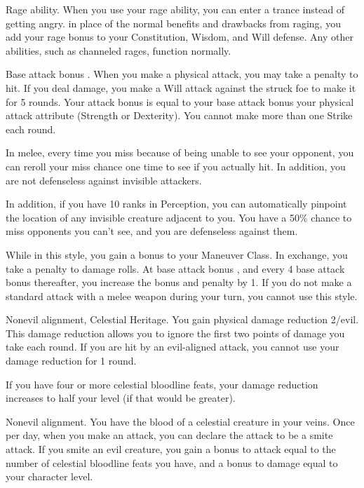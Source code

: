\featpre Rage ability.
\featben When you use your rage ability, you can enter a trance instead of getting angry. in place of the normal benefits and drawbacks from raging, you add your rage bonus to your Constitution, Wisdom, and Will defense. Any other abilities, such as channeled rages, function normally.

\featpre Base attack bonus .
\featben When you make a physical attack, you may take a  penalty to hit. If you deal damage, you make a Will attack against the struck foe to make it \bewildered for 5 rounds. Your attack bonus is equal to your base attack bonus \add your physical attack attribute (Strength or Dexterity). You cannot make more than one Strike each round.

 In melee, every time you miss because of being unable to see your opponent, you can reroll your miss chance one time to see if you actually hit. In addition, you are not defenseless against invisible attackers.
\par In addition, if you have 10 ranks in Perception, you can automatically pinpoint the location of any invisible creature adjacent to you.
 You have a 50\% chance to miss opponents you can't see, and you are defenseless against them.

 While in this style, you gain a  bonus to your Maneuver Class. In exchange, you take a  penalty to damage rolls. At base attack bonus , and every 4 base attack bonus thereafter, you increase the bonus and penalty by 1. If you do not make a standard attack with a melee weapon during your turn, you cannot use this style.

 Nonevil alignment, Celestial Heritage.
 You gain physical damage reduction 2/evil. This damage reduction allows you to ignore the first two points of damage you take each round. If you are hit by an evil-aligned attack, you cannot use your damage reduction for 1 round.

If you have four or more celestial bloodline feats, your damage reduction increases to half your level (if that would be greater).

 Nonevil alignment.
 You have the blood of a celestial creature in your veins. Once per day, when you make an attack, you can declare the attack to be a smite attack. If you smite an evil creature, you gain a bonus to attack equal to the number of celestial bloodline feats you have, and a bonus to damage equal to your character level.

